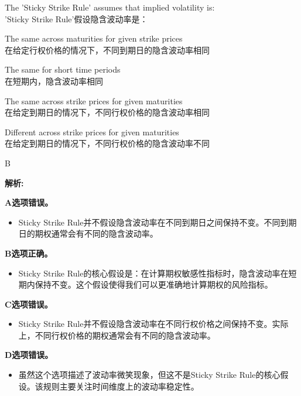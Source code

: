 \documentclass{article}
\newcounter{question} %
\newenvironment{explanation}
{\textbf{解析:}\par}
{\par}
\begin{document}
\begin{question}
    The 'Sticky Strike Rule' assumes that implied volatility is:
    \\ 'Sticky Strike Rule'假设隐含波动率是：
\end{question}

\begin{choices}
    \item The same across maturities for given strike prices
    \\ 在给定行权价格的情况下，不同到期日的隐含波动率相同
    \item The same for short time periods
    \\ 在短期内，隐含波动率相同
    \item The same across strike prices for given maturities
    \\ 在给定到期日的情况下，不同行权价格的隐含波动率相同
    \item Different across strike prices for given maturities
    \\ 在给定到期日的情况下，不同行权价格的隐含波动率不同
\end{choices}

\begin{correctanswer}
    B
\end{correctanswer}

\begin{explanation}
    \textbf{A选项错误。}
    \begin{itemize}
        \item Sticky Strike Rule并不假设隐含波动率在不同到期日之间保持不变。不同到期日的期权通常会有不同的隐含波动率。
    \end{itemize}
    
    \textbf{B选项正确。}
    \begin{itemize}
        \item Sticky Strike Rule的核心假设是：在计算期权敏感性指标时，隐含波动率在短期内保持不变。这个假设使得我们可以更准确地计算期权的风险指标。
    \end{itemize}
    
    \textbf{C选项错误。}
    \begin{itemize}
        \item Sticky Strike Rule并不假设隐含波动率在不同行权价格之间保持不变。实际上，不同行权价格的期权通常会有不同的隐含波动率。
    \end{itemize}
    
    \textbf{D选项错误。}
    \begin{itemize}
        \item 虽然这个选项描述了波动率微笑现象，但这不是Sticky Strike Rule的核心假设。该规则主要关注时间维度上的波动率稳定性。
    \end{itemize}
\end{explanation}
\end{document}
